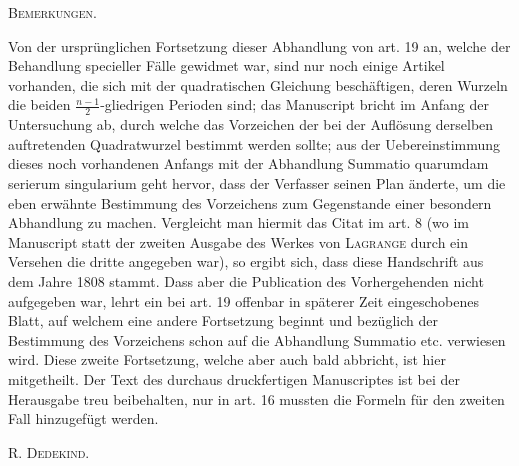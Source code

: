 \par\bigskip
{}
\begin{center}\textsc{Bemerkungen.}\end{center}
\begingroup\small
Von der ursprünglichen Fortsetzung dieser Abhandlung von art. 19 an, welche der Behandlung specieller Fälle gewidmet war, sind nur noch einige Artikel vorhanden, die sich mit der quadratischen Gleichung beschäftigen, deren Wurzeln die beiden $\frac{n-1}2$-gliedrigen Perioden sind; das Manuscript bricht im Anfang der Untersuchung ab, durch welche das Vorzeichen der bei der Auflösung derselben auftretenden Quadratwurzel bestimmt werden sollte; aus der Uebereinstimmung dieses noch vorhandenen Anfangs mit der Abhandlung Summatio quarumdam serierum singularium geht hervor, dass der Verfasser seinen Plan änderte, um die eben erwähnte Bestimmung des Vorzeichens zum Gegenstande einer besondern Abhandlung zu machen. Vergleicht man hiermit das Citat im art. 8 (wo im Manuscript statt der zweiten Ausgabe des Werkes von \textsc{Lagrange} durch ein Versehen die dritte angegeben war), so ergibt sich, dass diese Handschrift aus dem Jahre 1808 stammt. Dass aber die Publication des Vorhergehenden nicht aufgegeben war, lehrt ein bei art. 19 offenbar in späterer Zeit eingeschobenes Blatt, auf welchem eine andere Fortsetzung beginnt und bezüglich der Bestimmung des Vorzeichens schon auf die Abhandlung Summatio etc. verwiesen wird. Diese zweite Fortsetzung, welche aber auch bald abbricht, ist hier mitgetheilt. Der Text des durchaus druckfertigen Manuscriptes ist bei der Herausgabe treu beibehalten, nur in art. 16 mussten die Formeln für den zweiten Fall hinzugefügt werden.
\begin{flushright}R. \textsc{Dedekind}.\end{flushright}
\endgroup
{}

